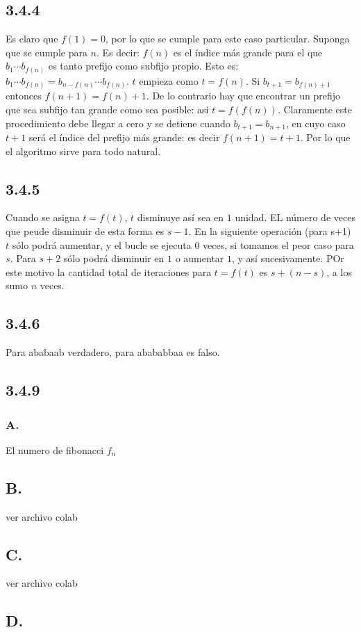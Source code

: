 \documentclass{article}
\begin{document}
\subsection*{3.4.4}
Es claro que $f(1)= 0$, por lo que se cumple para este caso particular. 
Suponga que se cumple para $n$. Es decir: $f(n)$ es el índice más grande para el que $b_1 \cdots b_{f(n)}$ es tanto prefijo como subfijo propio. Esto es: $b_1 \cdots b_{f(n)} = b_{n-f(n)} \cdots b_{f(n)}$. $t$ empieza como $t = f(n)$. Si $b_{t+1} = b_{f(n) + 1}$ entonces $f(n+1) = f(n) + 1$. De lo contrario hay que encontrar un prefijo que sea subfijo tan grande como sea posible: así $t = f(f(n))$. Claramente este procedimiento debe llegar a cero y se detiene cuando $b_{t+1} = b_{n+1}$, en cuyo caso $t+1$ será el índice del prefijo más grande: es decir $f(n+1) = t+1$. Por lo que el algoritmo sirve para todo natural. 

\subsection*{3.4.5}

Cuando se asigna $t = f(t)$, $t$ disminuye así sea en $1$ unidad. EL número de veces que peude disminuir de esta forma es $s-1$. En la siguiente operación (para s+1) $t$ sólo podrá aumentar, y el bucle se ejecuta $0$ veces, si tomamos el peor caso para $s$. Para $s+2$ sólo podrá disminuir en $1$ o aumentar $1$, y así sucesivamente. POr este motivo la cantidad total de iteraciones para $t=f(t)$ es $s+(n-s)$, a los sumo $n$ veces. 
\subsection*{3.4.6}
Para ababaab verdadero, para abababbaa es falso. 
\subsection*{3.4.9}
\subsubsection*{A.}
El numero de fibonacci $f_n$
\subsection*{B.}
ver archivo colab
\subsection*{C.}
ver archivo colab
\subsection{D.}
\end{document}
